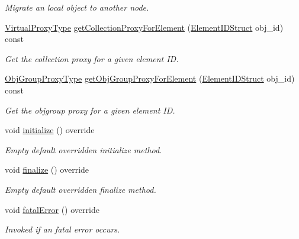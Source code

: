\begin{DoxyCompactItemize}
\begin{DoxyCompactList}\small\item\em Migrate an local object to another node. \end{DoxyCompactList}\item 
\hyperlink{namespacevt_a1b417dd5d684f045bb58a0ede70045ac}{Virtual\+Proxy\+Type} \hyperlink{structvt_1_1vrt_1_1collection_1_1balance_1_1_node_l_b_data_a7f815606907a31f74428f058c220bf54}{get\+Collection\+Proxy\+For\+Element} (\hyperlink{namespacevt_1_1vrt_1_1collection_1_1balance_a9f5b53fafb270212279a4757d2c4cd28}{Element\+I\+D\+Struct} obj\+\_\+id) const
\begin{DoxyCompactList}\small\item\em Get the collection proxy for a given element ID. \end{DoxyCompactList}\item 
\hyperlink{namespacevt_ad7cae989df485fccca57f0792a880a8e}{Obj\+Group\+Proxy\+Type} \hyperlink{structvt_1_1vrt_1_1collection_1_1balance_1_1_node_l_b_data_a1f410baa1f6a5088a814fdcda87ff6d4}{get\+Obj\+Group\+Proxy\+For\+Element} (\hyperlink{namespacevt_1_1vrt_1_1collection_1_1balance_a9f5b53fafb270212279a4757d2c4cd28}{Element\+I\+D\+Struct} obj\+\_\+id) const
\begin{DoxyCompactList}\small\item\em Get the objgroup proxy for a given element ID. \end{DoxyCompactList}\item 
void \hyperlink{structvt_1_1vrt_1_1collection_1_1balance_1_1_node_l_b_data_aa489e1252abac8237d30bb0110ad36f9}{initialize} () override
\begin{DoxyCompactList}\small\item\em Empty default overridden initialize method. \end{DoxyCompactList}\item 
void \hyperlink{structvt_1_1vrt_1_1collection_1_1balance_1_1_node_l_b_data_ac62cac77080f79e73e303c42ad850155}{finalize} () override
\begin{DoxyCompactList}\small\item\em Empty default overridden finalize method. \end{DoxyCompactList}\item 
void \hyperlink{structvt_1_1vrt_1_1collection_1_1balance_1_1_node_l_b_data_aefbc8058f2d74c3dd6c903e9bfefe0d2}{fatal\+Error} () override
\begin{DoxyCompactList}\small\item\em Invoked if an fatal error occurs. \end{DoxyCompactList}\item 

\end{DoxyCompactItemize}
